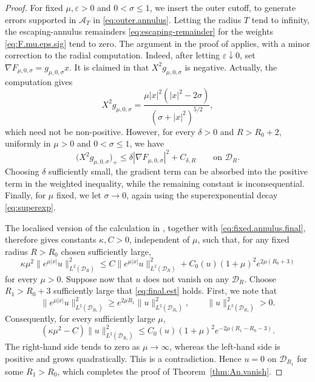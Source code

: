 \documentclass{article}
\theoremstyle{definition}
\numberwithin{thm}{section}
\numberwithin{equation}{section}
\newcommand{\norm}[1]{\lVert #1\rVert}
\begin{document}
\begin{proof}
For fixed $\mu,\varepsilon>0$ and $0<\sigma\leq1$, we insert
the outer cutoff, to generate errors supported in $\mathcal{A}_T$ in \eqref{eq:outer.annulus}.  Letting the radius $T$ tend to infinity,
the escaping-annulus remainders \eqref{eq:escaping-remainder} for the weights \eqref{eq:F.mu.eps.sig} tend to zero. The argument in the proof of
\cite[Theorem~4.8]{AHK} applies, with a minor correction
to the radial computation. Indeed, after letting $\varepsilon\downarrow0$, set
\(\nabla F_{\mu,0,\sigma}=g_{\mu,0,\sigma}x\). It is claimed in \cite[(4.26)]{AHK} that $X^2 g_{\mu, 0, \sigma}$ is negative. Actually, the computation gives
\begin{equation}
X^2g_{\mu,0,\sigma}
=
\frac{\mu |x|^2(|x|^2-2\sigma)}{(\sigma+|x|^2)^{5/2}},
\end{equation}
which need not be non-positive. However, for every \(\delta>0\) and $R>R_0+2$, 
uniformly in \(\mu>0\) and \(0<\sigma\leq 1\), we have
\begin{equation}
\bigl(X^2g_{\mu,0,\sigma}\bigr)_+
\leq
\delta|\nabla F_{\mu,0,\sigma}|^2+C_{\delta,R}
\qquad\text{on } \mathcal{D}_R.
\end{equation}
Choosing \(\delta\) sufficiently small, the gradient term can be
absorbed into the positive term in the weighted inequality, while the remaining constant is inconsequential. Finally, for $\mu$ fixed, we let
$\sigma\to0$, again using the superexponential decay \eqref{eq:superexp}.

The localised version of the calculation in
\cite[(4.24)--(4.28)]{AHK}, together with \eqref{eq:fixed.annulus.final}, therefore gives constants $\kappa,C>0$, independent of
$\mu$, such that, for any fixed radius $R>R_0$  chosen sufficiently large,
\begin{equation}\label{eq:final.est}
    \kappa\mu^2
       \norm{e^{\mu|x|}u}_{L^2(\mathcal D_R)}^2
    \leq
       C\norm{e^{\mu|x|}u}_{L^2(\mathcal D_R)}^2
       +C_0(u)(1+\mu)^2 e^{2\mu (R_0+3)}
\end{equation}
for every $\mu >0$.
Suppose now that $u$ does not vanish on any $\mathcal{D}_R$.  Choose
$R_1>R_0+3$ sufficiently large that \eqref{eq:final.est} holds.  First, we note that
\begin{equation}
    \norm{e^{\mu|x|}u}_{L^2(\mathcal D_{R_1})}^2
    \geq
    e^{2\mu R_1}\norm{u}_{L^2(\mathcal D_{R_1})}^2,
    \qquad
    \norm{u}_{L^2(\mathcal D_{R_1})}^2>0.
\end{equation}
Consequently, for every sufficiently large $\mu$,
\begin{equation}
    (\kappa\mu^2-C)
       \norm{u}_{L^2(\mathcal D_{R_1})}^2
    \leq
       C_0(u)(1+\mu)^2 e^{-2\mu(R_1-R_0-3)}.
\end{equation}
The right-hand side tends to zero as $\mu\to\infty$, whereas the
left-hand side is positive and grows quadratically.  This is a
contradiction.  Hence $u=0$ on $\mathcal D_{R_1}$ for some $R_1>R_0$,
which completes the proof of Theorem~\ref{thm:An.vanish}.
\end{proof}
\end{document}
